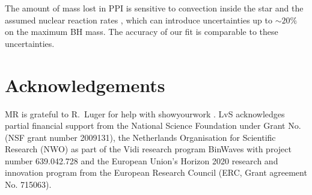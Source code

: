 \documentclass[twocolumn]{aastex63}
\begin{document}


The amount of mass lost in PPI is sensitive to convection inside the star
\citep{renzo:20conv} and the assumed nuclear reaction rates , which can introduce
  uncertainties up to $\sim{}20\%$ on the maximum BH mass. The accuracy
of our fit is comparable to these uncertainties.

\vspace*{-10pt}
\section*{Acknowledgements}
MR is grateful to R.~Luger for help with showyourwork \citep{luger:21}.
LvS acknowledges partial financial support from the National Science
Foundation under Grant No. (NSF grant number 2009131), the Netherlands
Organisation for Scientific Research (NWO) as part of the Vidi
research program BinWaves with project number 639.042.728 and the
European Union’s Horizon 2020 research and innovation program from the
European Research Council (ERC, Grant agreement No. 715063).


\newpage

\end{document}
